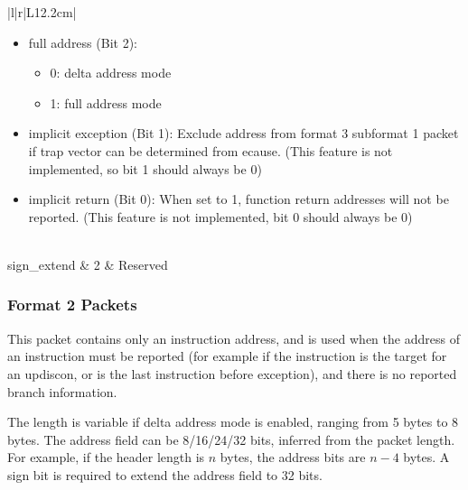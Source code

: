 \documentclass[main\_\_EN.tex]{subfiles}
\begin{document}
\begin{longtable}[c]{ |l|r|L{12.2cm}| }
\begin{itemize}
        \item full address (Bit 2):
            \begin{itemize}
                \item 0: delta address mode
                \item 1: full address mode
            \end{itemize}
        \item implicit exception (Bit 1): Exclude address from format 3 subformat 1 packet if trap vector can be determined from ecause. (This feature is not implemented, so bit 1 should always be 0)
        \item implicit return (Bit 0): When set to 1, function return addresses will not be reported. (This feature is not implemented, bit 0 should always be 0)
    \end{itemize}
    \\\hline
    sign\_extend & 2 & Reserved \\\hline

 \end{longtable}



\subsubsection{Format 2 Packets}

This packet contains only an instruction address, and is used when the address of an instruction must be reported (for example if the instruction is the target for an updiscon, or is the last instruction before exception), and there is no reported branch information.


The length is variable if delta address mode is enabled, ranging from 5 bytes to 8 bytes. The address field can be 8/16/24/32 bits, inferred from the packet length. For example, if the header length is $n$ bytes, the address bits are $n-4$ bytes. A sign bit is required to extend the address field to 32 bits.
\end{document}
